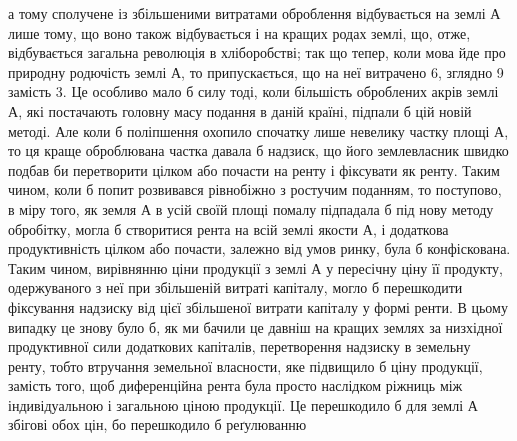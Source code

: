 а тому сполучене із збільшеними витратами оброблення відбувається на землі $А$
лише тому, що воно також відбувається і на кращих родах землі, що, отже,
відбувається загальна революція в хліборобстві; так що тепер, коли мова йде
про природну родючість землі $А$, то припускається, що на неї витрачено 6, зглядно
9 замість 3. Це особливо мало б силу тоді, коли більшість
оброблених акрів землі $А$, які постачають головну масу подання в даній країні,
підпали б цій новій методі. Але коли б поліпшення охопило спочатку лише
невелику частку площі $А$, то ця краще оброблювана частка давала б надзиск,
що його землевласник швидко подбав би перетворити цілком або почасти
на ренту і фіксувати як ренту. Таким чином, коли б попит розвивався рівнобіжно
з ростучим поданням, то поступово, в міру того, як земля $А$ в усій своїй площі
помалу підпадала б під нову методу обробітку, могла б створитися рента
на всій землі якости $А$, і додаткова продуктивність цілком або почасти, залежно
від умов ринку, була б конфіскована. Таким чином, вирівнянню ціни продукції
з землі $А$ у пересічну ціну її продукту, одержуваного з неї при збільшеній витраті
капіталу, могло б перешкодити фіксування надзиску від цієї збільшеної витрати
капіталу у формі ренти. В цьому випадку це знову було б, як ми бачили це
давніш на кращих землях за низхідної продуктивної сили додаткових капіталів,
перетворення надзиску в земельну ренту, тобто втручання земельної власности,
яке підвищило б ціну продукції, замість того, щоб диференційна рента була
просто наслідком ріжниць між індивідуальною і загальною ціною продукції. Це
перешкодило б для землі $А$ збігові обох цін, бо перешкодило б реґулюванню
\parbreak{}  %
